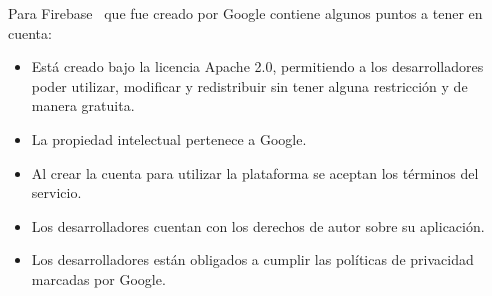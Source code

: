 Para Firebase~\cite{firebase} que fue creado por Google contiene algunos puntos a tener en cuenta:
\begin{itemize}
\tightlist 
\item Está creado bajo la licencia Apache 2.0, permitiendo a los desarrolladores poder utilizar, modificar y redistribuir sin tener alguna restricción y de manera gratuita.
\item La propiedad intelectual pertenece a Google.
\item Al crear la cuenta para utilizar la plataforma se aceptan los términos del servicio.
\item Los desarrolladores cuentan con los derechos de autor sobre su aplicación.
\item Los desarrolladores están obligados a cumplir las políticas de privacidad marcadas por Google.
\end{itemize}

